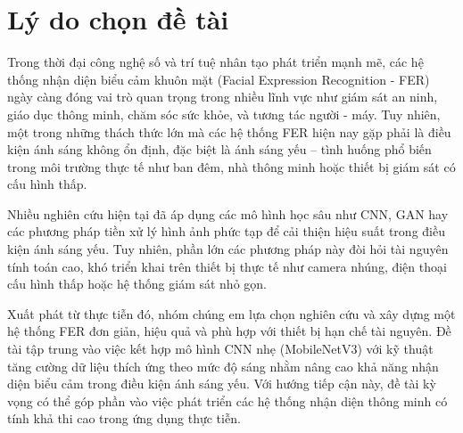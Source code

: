 \section{Lý do chọn đề tài}

Trong thời đại công nghệ số và trí tuệ nhân tạo phát triển mạnh mẽ, các hệ thống nhận diện biểu cảm khuôn mặt (Facial Expression Recognition - FER) ngày càng đóng vai trò quan trọng trong nhiều lĩnh vực như giám sát an ninh, giáo dục thông minh, chăm sóc sức khỏe, và tương tác người - máy. Tuy nhiên, một trong những thách thức lớn mà các hệ thống FER hiện nay gặp phải là điều kiện ánh sáng không ổn định, đặc biệt là ánh sáng yếu – tình huống phổ biến trong môi trường thực tế như ban đêm, nhà thông minh hoặc thiết bị giám sát có cấu hình thấp.

Nhiều nghiên cứu hiện tại đã áp dụng các mô hình học sâu như CNN, GAN hay các phương pháp tiền xử lý hình ảnh phức tạp để cải thiện hiệu suất trong điều kiện ánh sáng yếu. Tuy nhiên, phần lớn các phương pháp này đòi hỏi tài nguyên tính toán cao, khó triển khai trên thiết bị thực tế như camera nhúng, điện thoại cấu hình thấp hoặc hệ thống giám sát nhỏ gọn.

Xuất phát từ thực tiễn đó, nhóm chúng em lựa chọn nghiên cứu và xây dựng một hệ thống FER đơn giản, hiệu quả và phù hợp với thiết bị hạn chế tài nguyên. Đề tài tập trung vào việc kết hợp mô hình CNN nhẹ (MobileNetV3) với kỹ thuật tăng cường dữ liệu thích ứng theo mức độ sáng nhằm nâng cao khả năng nhận diện biểu cảm trong điều kiện ánh sáng yếu. Với hướng tiếp cận này, đề tài kỳ vọng có thể góp phần vào việc phát triển các hệ thống nhận diện thông minh có tính khả thi cao trong ứng dụng thực tiễn.